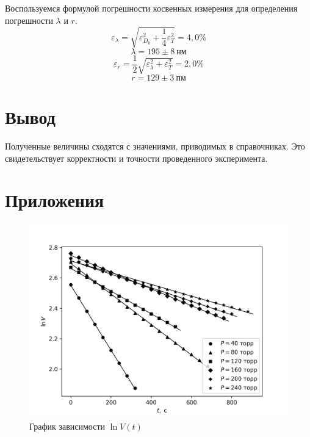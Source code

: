 \documentclass[14pt, a4paper]{report}
\begin{document}
Воспользуемся формулой погрешности косвенных измерения для определения погрешности $\lambda$ и $r$.
\[\varepsilon_\lambda=\sqrt{\varepsilon_{D_0}^2+\frac{1}{4}\varepsilon_T^2}=4,0\%\]
\[\lambda=195\pm8\ нм\]
\[\varepsilon_r=\frac{1}{2}\sqrt{\varepsilon_{\lambda}^2+\varepsilon_T^2}=2,0\%\]
\[r=129\pm3\ пм\]

\section{Вывод}

Полученные величины сходятся с значениями, приводимых в справочниках. Это свидетельствует корректности и точности проведенного эксперимента. 

\section{Приложения}
\begin{table}[!ht]
\centering
{}
\label{table1}
\caption{Вычисления коэффициента взаимной диффузии при различных давлениях}
\end{table}

\begin{figure}[!ht]
\centering
\includegraphics[scale=0.8]{terma_4_3.png}
\caption{График зависимости $\ln V(t)$}
\end{figure}
\end{document}
